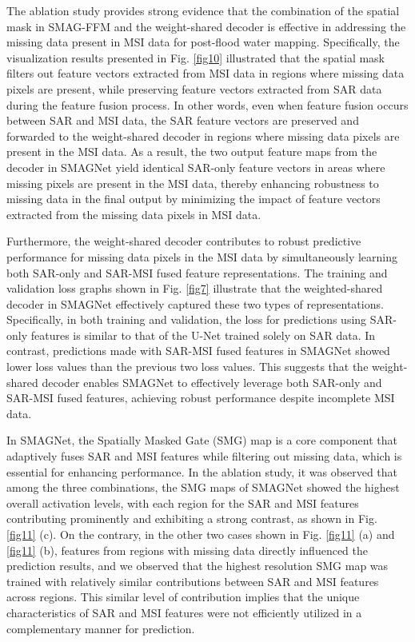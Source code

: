 \documentclass[preprint,12pt,authoryear]{elsarticle}
\begin{document}
The ablation study provides strong evidence that the combination of the spatial mask in SMAG-FFM and the weight-shared decoder is effective in addressing the missing data present in MSI data for post-flood water mapping. Specifically, the visualization results presented in Fig. \ref{fig10} illustrated that the spatial mask filters out feature vectors extracted from MSI data in regions where missing data pixels are present, while preserving feature vectors extracted from SAR data during the feature fusion process. In other words, even when feature fusion occurs between SAR and MSI data, the SAR feature vectors are preserved and forwarded to the weight-shared decoder in regions where missing data pixels are present in the MSI data. As a result, the two output feature maps from the decoder in SMAGNet yield identical SAR-only feature vectors in areas where missing pixels are present in the MSI data, thereby enhancing robustness to missing data in the final output by minimizing the impact of feature vectors extracted from the missing data pixels in MSI data.

Furthermore, the weight-shared decoder contributes to robust predictive performance for missing data pixels in the MSI data by simultaneously learning both SAR-only and SAR-MSI fused feature representations. The training and validation loss graphs shown in Fig. \ref{fig7} illustrate that the weighted-shared decoder in SMAGNet effectively captured these two types of representations. Specifically, in both training and validation, the loss for predictions using SAR-only features is similar to that of the U-Net trained solely on SAR data. In contrast, predictions made with SAR-MSI fused features in SMAGNet showed lower loss values than the previous two loss values. This suggests that the weight-shared decoder enables SMAGNet to effectively leverage both SAR-only and SAR-MSI fused features, achieving robust performance despite incomplete MSI data.

In SMAGNet, the Spatially Masked Gate (SMG) map is a core component that adaptively fuses SAR and MSI features while filtering out missing data, which is essential for enhancing performance. In the ablation study, it was observed that among the three combinations, the SMG maps of SMAGNet showed the highest overall activation levels, with each region for the SAR and MSI features contributing prominently and exhibiting a strong contrast, as shown in Fig. \ref{fig11} (c). On the contrary, in the other two cases shown in Fig. \ref{fig11} (a) and \ref{fig11} (b), features from regions with missing data directly influenced the prediction results, and we observed that the highest resolution SMG map was trained with relatively similar contributions between SAR and MSI features across regions. This similar level of contribution implies that the unique characteristics of SAR and MSI features were not efficiently utilized in a complementary manner for prediction.
\end{document}
